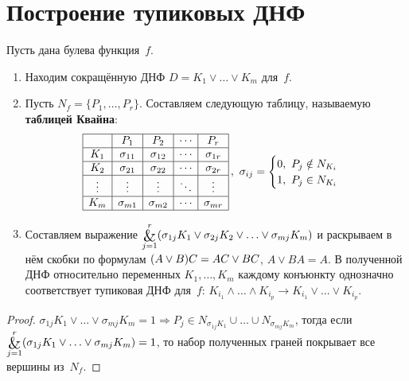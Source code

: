 \section{Построение тупиковых ДНФ}
Пусть дана булева функция~$f$.
\begin{enumerate}
	\item Находим сокращённую ДНФ $D = K_1 \lor \ldots \lor K_m$ для~$f$.
	
	\item Пусть $N_f = \{ P_1, \ldots, P_r \}$.
	Составляем следующую таблицу, называемую \textbf{таблицей Квайна}:
	\begin{equation*}
	\begin{array}{|c|c|c|c|c|}
	\hline
	    & P_1 & P_2 & \cdots & P_r \\
    \hline
	K_1 & \sigma_{11} & \sigma_{12} & \cdots & \sigma_{1r} \\
	\hline
	K_2 & \sigma_{21} & \sigma_{22} & \cdots & \sigma_{2r} \\
	\hline
	\vdots & \vdots & \vdots & \ddots & \vdots \\
	\hline
	K_m & \sigma_{m1} & \sigma_{m2} & \cdots & \sigma_{mr} \\
	\hline
	\end{array}\,, \
	\sigma_{ij} =
	\begin{cases}
	0, \ P_j \notin N_{K_i} \\
	1, \ P_j \in N_{K_i}
	\end{cases}
	\end{equation*}
	
	\item Составляем выражение $\bigand\limits_{j=1}^r (\sigma_{1j} K_1 \lor \sigma_{2j} K_2 \lor \ldots \lor \sigma_{mj} K_m)$ и раскрываем в нём скобки по формулам $(A \lor B)C \opbr= AC \lor BC$, $A \lor BA = A$.
	В полученной ДНФ относительно переменных $K_1, \ldots, K_m$ каждому конъюнкту однозначно соответствует тупиковая ДНФ для~$f$: $K_{i_1} \land \ldots \land K_{i_p} \to K_{i_1} \lor \ldots \lor K_{i_p}$.
\end{enumerate}
\begin{proof}
$\sigma_{1j} K_1 \lor \ldots \lor \sigma_{mj} K_m = 1 \Rightarrow
P_j \in N_{\sigma_{1j} K_1} \cup \ldots \cup N_{\sigma_{mj} K_m}$, тогда если
$\bigand\limits_{j=1}^r (\sigma_{1j} K_1 \lor \ldots \lor \sigma_{mj} K_m) = 1$, то набор полученных граней покрывает все вершины из~$N_f$.
\end{proof}